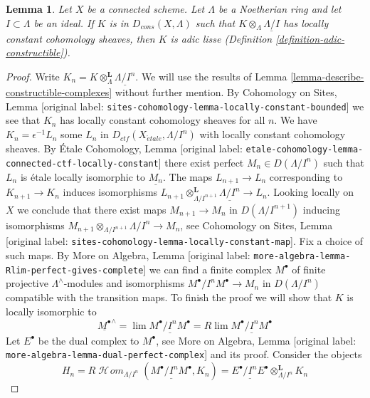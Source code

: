 \documentclass[10pt,a4paper]{article}
\theoremstyle{plain}
\newtheorem{lemma}[subsection]{Lemma}
\theoremstyle{definition}
\theoremstyle{remark}
\numberwithin{equation}{subsection}
\def\lim{\mathop{\mathrm{lim}}\nolimits}
\def\SheafHom{\mathop{\mathcal{H}\!\mathit{om}}\nolimits}
\def\etale{{\acute{e}tale}}
\begin{document}
\begin{lemma}
\label{lemma-connected-adic-lisse}
Let $X$ be a connected scheme. Let $\Lambda$ be a Noetherian ring and let
$I \subset \Lambda$ be an ideal. If $K$ is in $D_{cons}(X, \Lambda)$
such that $K \otimes_\Lambda \underline{\Lambda/I}$
has locally constant cohomology sheaves, then $K$ is adic lisse
(Definition \ref{definition-adic-constructible}).
\end{lemma}

\begin{proof}
Write $K_n = K \otimes_\Lambda^\mathbf{L} \underline{\Lambda/I^n}$.
We will use the results of Lemma \ref{lemma-describe-constructible-complexes}
without further mention. By Cohomology on Sites, Lemma
\textnormal{[original label: \nolinkurl{sites-cohomology-lemma-locally-constant-bounded}]}
we see that $K_n$ has locally constant cohomology sheaves for all $n$.
We have $K_n = \epsilon^{-1}L_n$ some $L_n$ in
$D_{ctf}(X_\etale, \Lambda/I^n)$ with locally constant cohomology sheaves.
By \'Etale Cohomology, Lemma
\textnormal{[original label: \nolinkurl{etale-cohomology-lemma-connected-ctf-locally-constant}]}
there exist perfect $M_n \in D(\Lambda/I^n)$
such that $L_n$ is \'etale locally isomorphic to $\underline{M_n}$.
The maps $L_{n + 1} \to L_n$ corresponding to $K_{n + 1} \to K_n$
induces isomorphisms
$L_{n + 1} \otimes_{\Lambda/I^{n + 1}}^\mathbf{L} \underline{\Lambda/I^n}
\to L_n$. Looking locally on $X$ we conclude that there
exist maps $M_{n + 1} \to M_n$ in $D(\Lambda/I^{n + 1})$
inducing isomorphisms
$M_{n + 1} \otimes_{\Lambda/I^{n + 1}} \Lambda/I^n \to M_n$, see
Cohomology on Sites, Lemma \textnormal{[original label: \nolinkurl{sites-cohomology-lemma-locally-constant-map}]}.
Fix a choice of such maps. By
More on Algebra, Lemma \textnormal{[original label: \nolinkurl{more-algebra-lemma-Rlim-perfect-gives-complete}]}
we can find a finite complex $M^\bullet$ of finite projective
$\Lambda^\wedge$-modules and isomorphisms $M^\bullet/I^nM^\bullet \to M_n$
in $D(\Lambda/I^n)$ compatible with the transition maps.
To finish the proof we will show that $K$ is locally isomorphic
to
$$
\underline{M^\bullet}^\wedge =
\lim \underline{M^\bullet/I^nM^\bullet} =
R\lim \underline{M^\bullet/I^nM^\bullet}
$$
Let $E^\bullet$ be the dual complex to $M^\bullet$, see
More on Algebra, Lemma \textnormal{[original label: \nolinkurl{more-algebra-lemma-dual-perfect-complex}]}
and its proof. Consider the objects
$$
H_n =
R\SheafHom_{\Lambda/I^n}(\underline{M^\bullet/I^nM^\bullet}, K_n) =
\underline{E^\bullet/I^nE^\bullet} \otimes_{\Lambda/I^n}^\mathbf{L} K_n
$$
\end{proof}
\end{document}
